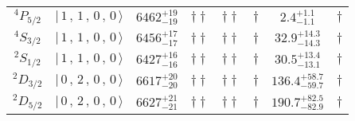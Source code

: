 \begin{tabular}{c| c c c c c c c}
$^{4}P_{5/2}$ & $\vert \,1\,,\,1\,,\,0\,,\,0 \,\rangle $ & $6462^{+19}_{-19}$ & $\dagger\dagger$ & $\dagger\dagger$ & $\dagger$ & $2.4^{+1.1}_{-1.1}$ & $\dagger$ \\ 
$^{4}S_{3/2}$ & $\vert \,1\,,\,1\,,\,0\,,\,0 \,\rangle $ & $6456^{+17}_{-17}$ & $\dagger\dagger$ & $\dagger\dagger$ & $\dagger$ & $32.9^{+14.3}_{-14.3}$ & $\dagger$ \\ 
$^{2}S_{1/2}$ & $\vert \,1\,,\,1\,,\,0\,,\,0 \,\rangle $ & $6427^{+16}_{-16}$ & $\dagger\dagger$ & $\dagger\dagger$ & $\dagger$ & $30.5^{+13.4}_{-13.1}$ & $\dagger$ \\ 
$^{2}D_{3/2}$ & $\vert \,0\,,\,2\,,\,0\,,\,0 \,\rangle $ & $6617^{+20}_{-20}$ & $\dagger\dagger$ & $\dagger\dagger$ & $\dagger$ & $136.4^{+58.7}_{-59.7}$ & $\dagger$ \\ 
$^{2}D_{5/2}$ & $\vert \,0\,,\,2\,,\,0\,,\,0 \,\rangle $ & $6627^{+21}_{-21}$ & $\dagger\dagger$ & $\dagger\dagger$ & $\dagger$ & $190.7^{+82.5}_{-82.9}$ & $\dagger$ \\ 
\hline \hline
\end{tabular}
